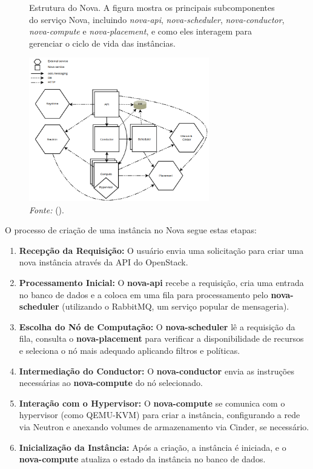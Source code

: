 \begin{figure}[htbp]
  \centering
  \caption{Estrutura do Nova. A figura mostra os principais subcomponentes do serviço Nova, incluindo \textit{nova-api}, \textit{nova-scheduler}, \textit{nova-conductor}, \textit{nova-compute} e \textit{nova-placement}, e como eles interagem para gerenciar o ciclo de vida das instâncias.}
  \includegraphics[width=0.7\textwidth]{images/nova_structure.png}
  \caption*{\textit{Fonte:} (\cite{DocumentacaoOpenstack}).}
  \label{fig:nova_structure}
\end{figure}


O processo de criação de uma instância no Nova segue estas etapas:

\begin{enumerate}
    \item \textbf{Recepção da Requisição:} O usuário envia uma solicitação para criar uma nova instância através da API do OpenStack.
    \item \textbf{Processamento Inicial:} O \textbf{nova-api} recebe a requisição, cria uma entrada no banco de dados e a coloca em uma fila para processamento pelo \textbf{nova-scheduler} (utilizando o RabbitMQ, um serviço popular de mensageria).
    \item \textbf{Escolha do Nó de Computação:} O \textbf{nova-scheduler} lê a requisição da fila, consulta o \textbf{nova-placement} para verificar a disponibilidade de recursos e seleciona o nó mais adequado aplicando filtros e políticas.
    \item \textbf{Intermediação do Conductor:} O \textbf{nova-conductor} envia as instruções necessárias ao \textbf{nova-compute} do nó selecionado.
    \item \textbf{Interação com o Hypervisor:} O \textbf{nova-compute} se comunica com o hypervisor (como QEMU-KVM) para criar a instância, configurando a rede via Neutron e anexando volumes de armazenamento via Cinder, se necessário.
    \item \textbf{Inicialização da Instância:} Após a criação, a instância é iniciada, e o \textbf{nova-compute} atualiza o estado da instância no banco de dados.
\end{enumerate}


